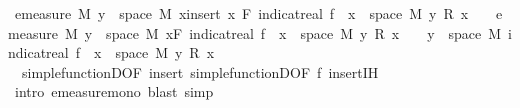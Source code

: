 \begin{isabellebody}
\ {\isachardoublequoteopen}emeasure\ M\ {\isacharbraceleft}{\kern0pt}y\ {\isasymin}\ space\ M{\isachardot}{\kern0pt}\ {\isacharparenleft}{\kern0pt}{\isasymSum}x{\isasymin}insert\ x\ F{\isachardot}{\kern0pt}\ indicat{\isacharunderscore}{\kern0pt}real\ {\isacharparenleft}{\kern0pt}f\ {\isacharminus}{\kern0pt}{\isacharbackquote}{\kern0pt}\ {\isacharbraceleft}{\kern0pt}x{\isacharbraceright}{\kern0pt}\ {\isasyminter}\ space\ M{\isacharparenright}{\kern0pt}\ y\ {\isacharasterisk}{\kern0pt}\isactrlsub R\ x{\isacharparenright}{\kern0pt}\ {\isasymnoteq}\ {}{\isacharbraceright}{\kern0pt}\ {\isasymle}\ emeasure\ M\ {\isacharparenleft}{\kern0pt}{\isacharbraceleft}{\kern0pt}y\ {\isasymin}\ space\ M{\isachardot}{\kern0pt}\ {\isacharparenleft}{\kern0pt}{\isasymSum}x{\isasymin}F{\isachardot}{\kern0pt}\ indicat{\isacharunderscore}{\kern0pt}real\ {\isacharparenleft}{\kern0pt}f\ {\isacharminus}{\kern0pt}{\isacharbackquote}{\kern0pt}\ {\isacharbraceleft}{\kern0pt}x{\isacharbraceright}{\kern0pt}\ {\isasyminter}\ space\ M{\isacharparenright}{\kern0pt}\ y\ {\isacharasterisk}{\kern0pt}\isactrlsub R\ x{\isacharparenright}{\kern0pt}\ {\isasymnoteq}\ {}{\isacharbraceright}{\kern0pt}\ {\isasymunion}\ {\isacharbraceleft}{\kern0pt}y\ {\isasymin}\ space\ M{\isachardot}{\kern0pt}\ indicat{\isacharunderscore}{\kern0pt}real\ {\isacharparenleft}{\kern0pt}f\ {\isacharminus}{\kern0pt}{\isacharbackquote}{\kern0pt}\ {\isacharbraceleft}{\kern0pt}x{\isacharbraceright}{\kern0pt}\ {\isasyminter}\ space\ M{\isacharparenright}{\kern0pt}\ y\ {\isacharasterisk}{\kern0pt}\isactrlsub R\ x\ {\isasymnoteq}\ {}{\isacharbraceright}{\kern0pt}{\isacharparenright}{\kern0pt}{\isachardoublequoteclose}\isanewline
\ \ \ \ \ \ \ \ \ \ \isamarkupfalse%
\ {\isacharasterisk}{\kern0pt}{\isacharasterisk}{\kern0pt}\ simple{\isacharunderscore}{\kern0pt}functionD{\isacharparenleft}{\kern0pt}{}{\isacharparenright}{\kern0pt}{\isacharbrackleft}{\kern0pt}OF\ insert{\isacharparenleft}{\kern0pt}{}{\isacharparenright}{\kern0pt}{\isacharbrackright}{\kern0pt}\ simple{\isacharunderscore}{\kern0pt}functionD{\isacharparenleft}{\kern0pt}{}{\isacharparenright}{\kern0pt}{\isacharbrackleft}{\kern0pt}OF\ f{\isacharparenleft}{\kern0pt}{}{\isacharparenright}{\kern0pt}{\isacharbrackright}{\kern0pt}\ insert{\isachardot}{\kern0pt}IH{\isacharparenleft}{\kern0pt}{}{\isacharparenright}{\kern0pt}\ \isamarkupfalse%
\ {\isacharparenleft}{\kern0pt}intro\ emeasure{\isacharunderscore}{\kern0pt}mono{\isacharcomma}{\kern0pt}\ blast{\isacharcomma}{\kern0pt}\ simp{\isacharparenright}{\kern0pt}\ \isanewline

\end{isabellebody}
